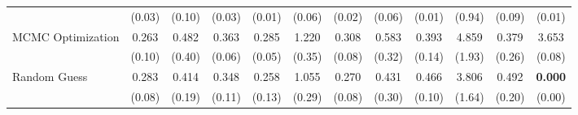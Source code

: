 \begin{table}[ht]
{\begin{tabular}{l cccc cccc cc c}
             & (0.03) & (0.10) & (0.03) & (0.01) & (0.06) & (0.02) & (0.06) & (0.01) & (0.94) & (0.09) & (0.01) \\
            \addlinespace[0.2em]
            MCMC Optimization & 0.263 & 0.482 & 0.363 & 0.285 & 1.220 & 0.308 & 0.583 & 0.393 & 4.859 & 0.379 & 3.653 \\
             & (0.10) & (0.40) & (0.06) & (0.05) & (0.35) & (0.08) & (0.32) & (0.14) & (1.93) & (0.26) & (0.08) \\
            \addlinespace[0.2em]
            Random Guess & 0.283 & 0.414 & 0.348 & 0.258 & 1.055 & 0.270 & 0.431 & 0.466 & 3.806 & 0.492 & \textbf{0.000} \\
             & (0.08) & (0.19) & (0.11) & (0.13) & (0.29) & (0.08) & (0.30) & (0.10) & (1.64) & (0.20) & (0.00) \\
            \bottomrule
        \end{tabular}%
    }
\end{table}